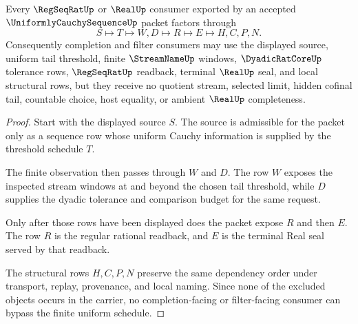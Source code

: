 \begin{theorem}
\label{thm:uniformly-cauchy-sequence-regseqrat-handoff}
Every $\RegSeqRatUp$ or $\RealUp$ consumer exported by an accepted $\UniformlyCauchySequenceUp$ packet factors through
$$
S \longmapsto T \longmapsto W,D \longmapsto R \longmapsto E \longmapsto H,C,P,N .
$$
Consequently completion and filter consumers may use the displayed source, uniform tail threshold, finite $\StreamNameUp$ windows, $\DyadicRatCoreUp$ tolerance rows, $\RegSeqRatUp$ readback, terminal $\RealUp$ seal, and local structural rows, but they receive no quotient stream, selected limit, hidden cofinal tail, countable choice, host equality, or ambient $\RealUp$ completeness.
\end{theorem}
\begin{proof}
Start with the displayed source $S$. The source is admissible for the packet only as a sequence row whose uniform Cauchy information is supplied by the threshold schedule $T$.

The finite observation then passes through $W$ and $D$. The row $W$ exposes the inspected stream windows at and beyond the chosen tail threshold, while $D$ supplies the dyadic tolerance and comparison budget for the same request.

Only after those rows have been displayed does the packet expose $R$ and then $E$. The row $R$ is the regular rational readback, and $E$ is the terminal Real seal served by that readback.

The structural rows $H,C,P,N$ preserve the same dependency order under transport, replay, provenance, and local naming. Since none of the excluded objects occurs in the carrier, no completion-facing or filter-facing consumer can bypass the finite uniform schedule.
\end{proof}



